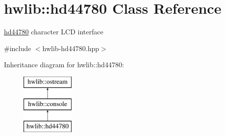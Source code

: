 \hypertarget{classhwlib_1_1hd44780}{}\section{hwlib\+:\+:hd44780 Class Reference}
\label{classhwlib_1_1hd44780}


\hyperlink{classhwlib_1_1hd44780}{hd44780} character L\+CD interface  




{\ttfamily \#include $<$hwlib-\/hd44780.\+hpp$>$}

Inheritance diagram for hwlib\+:\+:hd44780\+:\begin{figure}[H]
\begin{center}
\leavevmode
\includegraphics[height=3.000000cm]{classhwlib_1_1hd44780}
\end{center}
\end{figure}
